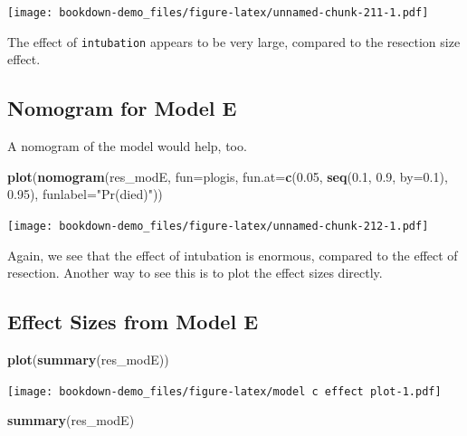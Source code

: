 \documentclass[]{book}
\newenvironment{Shaded}{\begin{snugshade}}{\end{snugshade}}
\newcommand{\KeywordTok}[1]{\textcolor[rgb]{0.13,0.29,0.53}{\textbf{#1}}}
\newcommand{\DataTypeTok}[1]{\textcolor[rgb]{0.13,0.29,0.53}{#1}}
\newcommand{\FloatTok}[1]{\textcolor[rgb]{0.00,0.00,0.81}{#1}}
\newcommand{\StringTok}[1]{\textcolor[rgb]{0.31,0.60,0.02}{#1}}
\newcommand{\NormalTok}[1]{#1}
\theoremstyle{definition}
\theoremstyle{definition}
\theoremstyle{definition}
\theoremstyle{remark}
\begin{document}
\texttt{[image: bookdown-demo\_files/figure-latex/unnamed-chunk-211-1.pdf]}

The effect of \texttt{intubation} appears to be very large, compared to
the resection size effect.

\subsection{Nomogram for Model E}\label{nomogram-for-model-e}

A nomogram of the model would help, too.

\begin{Shaded}
\begin{Highlighting}[]
\KeywordTok{plot}\NormalTok{(}\KeywordTok{nomogram}\NormalTok{(res_modE, }\DataTypeTok{fun=}\NormalTok{plogis, }
              \DataTypeTok{fun.at=}\KeywordTok{c}\NormalTok{(}\FloatTok{0.05}\NormalTok{, }\KeywordTok{seq}\NormalTok{(}\FloatTok{0.1}\NormalTok{, }\FloatTok{0.9}\NormalTok{, }\DataTypeTok{by=}\FloatTok{0.1}\NormalTok{), }\FloatTok{0.95}\NormalTok{), }
              \DataTypeTok{funlabel=}\StringTok{"Pr(died)"}\NormalTok{))}
\end{Highlighting}
\end{Shaded}

\texttt{[image: bookdown-demo\_files/figure-latex/unnamed-chunk-212-1.pdf]}

Again, we see that the effect of intubation is enormous, compared to the
effect of resection. Another way to see this is to plot the effect sizes
directly.

\subsection{Effect Sizes from Model E}\label{effect-sizes-from-model-e}

\begin{Shaded}
\begin{Highlighting}[]
\KeywordTok{plot}\NormalTok{(}\KeywordTok{summary}\NormalTok{(res_modE))}
\end{Highlighting}
\end{Shaded}

\texttt{[image: bookdown-demo\_files/figure-latex/model c effect plot-1.pdf]}

\begin{Shaded}
\begin{Highlighting}[]
\KeywordTok{summary}\NormalTok{(res_modE)}
\end{Highlighting}
\end{Shaded}
\end{document}
